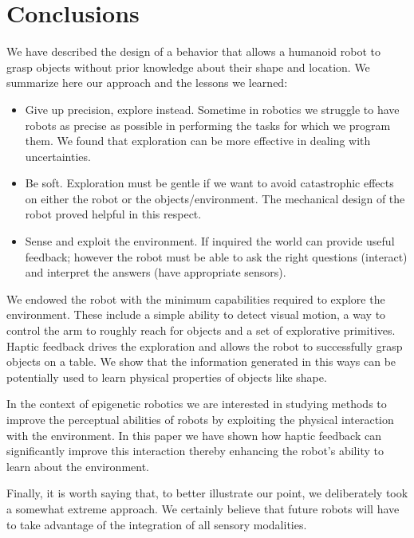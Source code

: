 \section{Conclusions}
\label{sec:conclusions}

We have described the design of a behavior that allows a humanoid
robot to grasp objects without prior knowledge about their shape
and location. We summarize here our approach and the lessons 
we learned:
%
\begin{itemize}
%
\item Give up precision, explore instead. Sometime in robotics
we struggle to have robots as precise as possible in performing
the tasks for which we program them. We found that exploration
can be more effective in dealing with uncertainties.
%
\item Be soft. Exploration must be gentle if we want to avoid
catastrophic effects on either the robot or the
objects/environment. The mechanical design of the robot proved
helpful in this respect.
%
\item Sense and exploit the environment. If inquired the world
can provide useful feedback; however the robot must be able
to ask the right questions (interact) and interpret the answers
(have appropriate sensors).
%
\end{itemize}

We endowed the robot with the minimum capabilities required to explore
the environment. These include a simple ability to detect visual
motion, a way to control the arm to roughly reach for objects and a
set of explorative primitives. Haptic feedback drives the
exploration and allows the robot to successfully grasp objects on
a table. We show that the information generated in this ways
can be potentially used to learn physical properties of objects like shape.


In the context of epigenetic robotics we are interested in studying
methods to improve the perceptual abilities of robots by exploiting the
physical interaction with the environment. In this paper we have shown
how haptic feedback can significantly improve this interaction thereby
enhancing the robot's ability to learn about the environment.

Finally, it is worth saying that, to better illustrate our point, we
deliberately took a somewhat extreme approach. We certainly believe 
that future robots will have to take advantage of the integration of
all sensory modalities.


